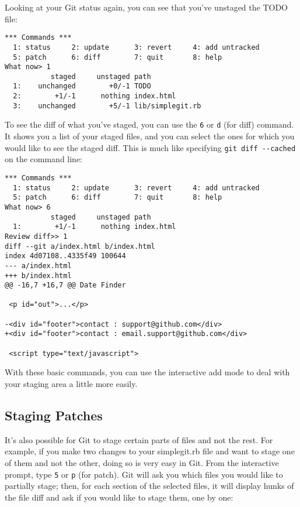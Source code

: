 \documentclass[a4paper]{book}
\begin{document}
Looking at your Git status again, you can see that you've unstaged the TODO file:

\begin{shaded}\begin{verbatim}
*** Commands ***
  1: status     2: update      3: revert     4: add untracked
  5: patch      6: diff        7: quit       8: help
What now> 1
           staged     unstaged path
  1:    unchanged        +0/-1 TODO
  2:        +1/-1      nothing index.html
  3:    unchanged        +5/-1 lib/simplegit.rb
\end{verbatim}\end{shaded}

To see the diff of what you've staged, you can use the \texttt{6} or \texttt{d} (for diff) command. It shows you a list of your staged files, and you can select the ones for which you would like to see the staged diff. This is much like specifying \texttt{git diff -{}-cached} on the command line:

\begin{shaded}\begin{verbatim}
*** Commands ***
  1: status     2: update      3: revert     4: add untracked
  5: patch      6: diff        7: quit       8: help
What now> 6
           staged     unstaged path
  1:        +1/-1      nothing index.html
Review diff>> 1
diff --git a/index.html b/index.html
index 4d07108..4335f49 100644
--- a/index.html
+++ b/index.html
@@ -16,7 +16,7 @@ Date Finder

 <p id="out">...</p>

-<div id="footer">contact : support@github.com</div>
+<div id="footer">contact : email.support@github.com</div>

 <script type="text/javascript">
\end{verbatim}\end{shaded}

With these basic commands, you can use the interactive add mode to deal with your staging area a little more easily.

\subsection{Staging Patches}

It's also possible for Git to stage certain parts of files and not the rest. For example, if you make two changes to your simplegit.rb file and want to stage one of them and not the other, doing so is very easy in Git. From the interactive prompt, type \texttt{5} or \texttt{p} (for patch). Git will ask you which files you would like to partially stage; then, for each section of the selected files, it will display hunks of the file diff and ask if you would like to stage them, one by one:
\end{document}
